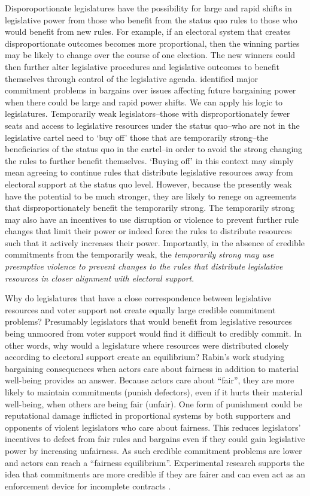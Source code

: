\documentclass[a4paper]{article}\usepackage[]{graphicx}\usepackage[]{color}
\begin{document}
Disporoportionate legislatures have the possibility for large and rapid shifts in legislative power from those who benefit from the status quo rules to those who would benefit from new rules. For example, if an electoral system that creates disproportionate outcomes becomes more proportional, then the winning parties may be likely to change over the course of one election. The new winners could then further alter legislative procedures and legislative outcomes to benefit themselves through control of the legislative agenda. \cite{Powell2004,Powell2006} identified major commitment problems in bargains over issues affecting future bargaining power when there could be large and rapid power shifts. We can apply his logic to legislatures. Temporarily weak legislators--those with disproportionately fewer seats and access to legislative resources under the status quo--who are not in the legislative cartel need to `buy off' those that are temporarily strong--the beneficiaries of the status quo in the cartel--in order to avoid the strong changing the rules to further benefit themselves. `Buying off' in this context may simply mean agreeing to continue rules that distribute legislative resources away from electoral support at the status quo level. However, because the presently weak have the potential to be much stronger, they are likely to renege on agreements that disproportionately benefit the temporarily strong. The temporarily strong may also have an incentives to use disruption or violence to prevent further rule changes that limit their power or indeed force the rules to distribute resources such that it actively increases their power. Importantly, in the absence of credible commitments from the temporarily weak, the \emph{temporarily strong may use preemptive violence to prevent changes to the rules that distribute legislative resources in closer alignment with electoral support}.

Why do legislatures that have a close correspondence between legislative resources and voter support not create equally large credible commitment problems? Presumably legislators that would benefit from legislative resources being unmoored from voter support would find it difficult to credibly commit. In other words, why would a legislature where resources were distributed closely according to electoral support create an equilibrium? Rabin's \citeyearpar{Rabin1993} work studying bargaining consequences when actors care about fairness in addition to material well-being provides an answer. Because actors care about ``fair'', they are more likely to maintain commitments (punish defectors), even if it hurts their material well-being, when others are being fair (unfair). One form of punishment could be reputational damage inflicted in proportional systems by both supporters and opponents of violent legislators who care about fairness. This reduces legislators' incentives to defect from fair rules and bargains even if they could gain legislative power by increasing unfairness. As such credible commitment problems are lower and actors can reach a ``fairness equilibrium''. Experimental research supports the idea that commitments are more credible if they are fairer \citep{Ellingsen2004} and can even act as an enforcement device for incomplete contracts \citep{Fehr2008}.
\end{document}
